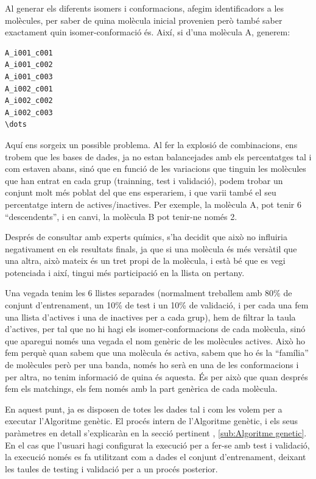 \documentclass[titlepage,a4paper,12pt]{book}
\begin{document}
Al generar els diferents isomers i conformacions, afegim identificadors a les
molècules, per saber de quina molècula inicial provenien però també saber
exactament quin isomer-conformació és.  Així, si d'una molècula A, generem:

\begin{verbatim}
A_i001_c001
A_i001_c002
A_i001_c003
A_i002_c001
A_i002_c002
A_i002_c003
\dots
\end{verbatim}


Aquí ens sorgeix un possible problema.  Al fer la explosió de combinacions, ens
trobem que les bases de dades, ja no estan balancejades amb els percentatges tal
i com estaven abans, sinó que en funció de les variacions que tinguin les
molècules que han entrat en cada grup (trainning, test i validació), podem
trobar un conjunt molt més poblat del que ens esperariem, i que varii també el
seu percentatge intern de actives/inactives. Per exemple, la molècula A, pot
tenir 6 ``descendents'', i en canvi, la molècula B pot tenir-ne només 2.

Després de consultar amb experts químics, s'ha decidit que això no influiria
negativament en els resultats finals, ja que si una molècula és més versàtil que
una altra, això mateix és un tret propi de la molècula, i està bé que es vegi
potenciada i així, tingui més participació en la llista on pertany.

Una vegada tenim les 6 llistes separades (normalment treballem amb 80\% de
conjunt d'entrenament, un 10\% de test i un 10\% de validació, i per cada una
fem una llista d'actives i una de inactives per a cada grup),  hem de filtrar la
taula d'actives, per tal que no hi hagi els  isomer-conformacions de cada
molècula, sinó que aparegui només una vegada el nom genèric de les molècules
actives.  Això ho fem perquè quan sabem que una molècula és activa, sabem que ho
és la ``família'' de molècules però per una banda, només ho serà en una de les
conformacions i per altra, no tenim informació de quina és aquesta.  És per això
que quan després fem els matchings, els fem només amb la part genèrica de cada
molècula.



En aquest punt, ja es disposen de totes les dades tal i com les volem per a
executar l'Algoritme genètic.  El procés intern de l'Algoritme genètic, i els
seus paràmetres en detall s'explicaràn en la secció pertinent ,
\ref{sub:Algoritme genetic}.  En el cas que l'usuari hagi configurat la execució
per a fer-se amb test i validació, la execució només es fa utilitzant com a
dades el conjunt d'entrenament, deixant les taules de testing i validació per a
un procés posterior.
\end{document}
